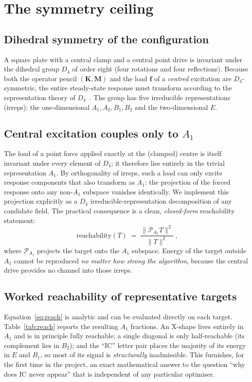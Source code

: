 \documentclass[11pt,a4paper]{article}
\newcommand{\Aone}{A_1}
\newcommand{\Dfour}{D_4}
\newcommand{\matK}{\mathbf{K}}
\newcommand{\matM}{\mathbf{M}}
\begin{document}
\section{The symmetry ceiling}\label{sec:theory}

\subsection{Dihedral symmetry of the configuration}
A square plate with a central clamp and a central point drive is invariant under
the dihedral group $\Dfour$ of order eight (four rotations and four
reflections). Because both the operator pencil $(\matK,\matM)$ and the load
$\bm{f}$ of a \emph{centred} excitation are $\Dfour$-symmetric, the entire
steady-state response must transform according to the representation theory of
$\Dfour$~\cite{tinkham1964}. The group has five irreducible representations
(irreps): the one-dimensional $A_1,A_2,B_1,B_2$ and the two-dimensional $E$.

\subsection{Central excitation couples only to \texorpdfstring{$\Aone$}{A1}}
The load of a point force applied exactly at the (clamped) centre is itself
invariant under every element of $\Dfour$; it therefore lies entirely in the
trivial representation $\Aone$. By orthogonality of irreps, such a load can only
excite response components that also transform as $\Aone$: the projection of the
forced response onto any non-$\Aone$ subspace vanishes identically. We implement
this projection explicitly as a $\Dfour$ irreducible-representation
decomposition of any candidate field. The practical consequence is a clean,
\emph{closed-form} reachability statement:
\begin{equation}
\boxed{\;\text{reachability}(T)\;=\;\frac{\lVert \mathcal{P}_{\Aone} T\rVert^2}
{\lVert T\rVert^2}\;,}
\label{eq:reach}
\end{equation}
where $\mathcal{P}_{\Aone}$ projects the target onto the $\Aone$ subspace. Energy
of the target outside $\Aone$ cannot be reproduced \emph{no matter how strong the
algorithm}, because the central drive provides no channel into those irreps.

\subsection{Worked reachability of representative targets}
Equation~\eqref{eq:reach} is analytic and can be evaluated directly on each
target. Table~\ref{tab:reach} reports the resulting $\Aone$ fractions. An X-shape
lives entirely in $\Aone$ and is in principle fully reachable; a single diagonal
is only half-reachable (its complement lies in $B_2$); and the ``IC'' letter pair
places the majority of its energy in $E$ and $B_1$, so most of its signal is
\emph{structurally} inadmissible. This furnishes, for the first time in the
project, an exact mathematical answer to the question ``why does IC never appear''
that is independent of any particular optimiser.
\end{document}
